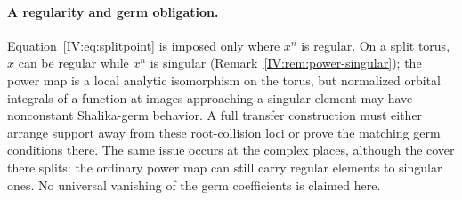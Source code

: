 \paragraph{A regularity and germ obligation.}
Equation~\eqref{IV:eq:splitpoint} is imposed only where $x^n$ is
regular.  On a split torus, $x$ can be regular while $x^n$ is
singular (Remark~\ref{IV:rem:power-singular}); the power map is a
local analytic isomorphism on the torus, but normalized orbital
integrals of a function at images approaching a singular element
may have nonconstant Shalika-germ behavior.  A full transfer
construction must either arrange support away from these
root-collision loci or prove the matching germ conditions there.
The same issue occurs at the complex places, although the cover
there splits: the ordinary power map can still carry regular
elements to singular ones. No universal vanishing of the germ
coefficients is claimed here.

